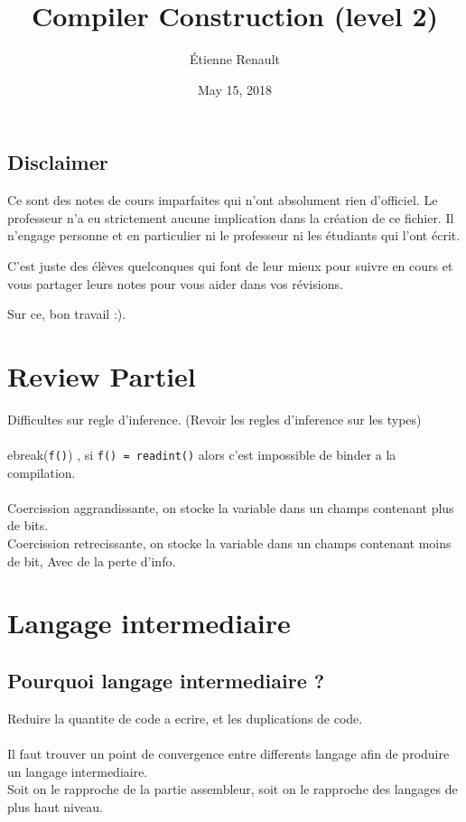 \documentclass[a4paper,11pt]{article}
\title{Compiler Construction (level 2)}
\author{Étienne Renault}
\date{May 15, 2018}
\begin{document}
\maketitle
\subsection*{Disclaimer}

Ce sont des notes de cours imparfaites qui n'ont absolument rien d'officiel.
Le professeur n'a eu strictement aucune implication dans la création de ce
fichier. Il n'engage personne et en particulier ni le professeur ni les
étudiants qui l'ont écrit.

C'est juste des élèves quelconques qui font de leur mieux pour suivre en cours
et vous partager leurs notes pour vous aider dans vos révisions.

Sur ce, bon travail :).
\tableofcontents
\newpage

\section*{Review Partiel}

Difficultes sur regle d'inference. (Revoir les regles d'inference sur les types)\\\\
ebreak(\texttt{f()}) , si \texttt{f() = readint()} alors c'est impossible de binder  a la compilation.\\\\
Coercission  aggrandissante, on stocke la variable dans un champs contenant plus de bits.\\
Coercission retrecissante, on stocke la variable dans un champs contenant moins de bit, Avec de la perte d'info.

\section{Langage intermediaire}

\subsection{Pourquoi langage intermediaire ?}
Reduire la quantite de code a ecrire, et les duplications de code.\\\\
Il faut trouver un point de convergence entre differents langage afin de produire  un langage intermediaire.\\
Soit on le rapproche de la partie assembleur, soit on le rapproche des langages de plus haut niveau.\\
\end{document}
